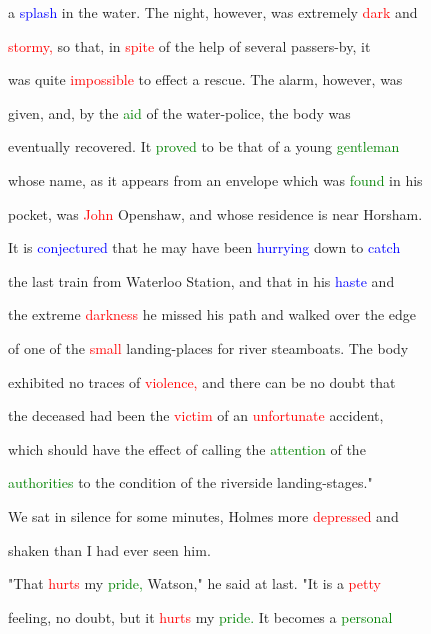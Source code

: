  a \textcolor{blue}{splash} in the water. The night, however, was extremely \textcolor{red}{dark} and

 \textcolor{red}{stormy,} so that, in \textcolor{red}{spite} of the help of several passers-by, it

 was quite \textcolor{red}{impossible} to effect a \textcolor{BurntOrange}{rescue.} The \textcolor{BurntOrange}{alarm,} however, was

 given, and, by the \textcolor{green}{aid} of the water-police, the body was

 eventually recovered. It \textcolor{green}{proved} to be that of a \textcolor{BurntOrange}{young} \textcolor{green}{gentleman}

 whose name, as it appears from an envelope which was \textcolor{green}{found} in his

 pocket, was \textcolor{red}{John} Openshaw, and whose residence is near Horsham.

 It is \textcolor{blue}{conjectured} that he may have been \textcolor{blue}{hurrying} down to \textcolor{blue}{catch}

 the last train from Waterloo Station, and that in his \textcolor{blue}{haste} and

 the extreme \textcolor{red}{darkness} he missed his path and walked over the edge

 of one of the \textcolor{red}{small} landing-places for river steamboats. The body

 exhibited no traces of \textcolor{red}{violence,} and there can be no \textcolor{BurntOrange}{doubt} that

 the deceased had been the \textcolor{red}{victim} of an \textcolor{red}{unfortunate} \textcolor{BurntOrange}{accident,}

 which should have the effect of calling the \textcolor{green}{attention} of the

 \textcolor{green}{authorities} to the condition of the riverside landing-stages."



 We sat in silence for some minutes, Holmes more \textcolor{red}{depressed} and

 shaken than I had ever seen him.



 "That \textcolor{red}{hurts} my \textcolor{green}{pride,} Watson," he said at last. "It is a \textcolor{red}{petty}

 feeling, no \textcolor{BurntOrange}{doubt,} but it \textcolor{red}{hurts} my \textcolor{green}{pride.} It becomes a \textcolor{green}{personal}

